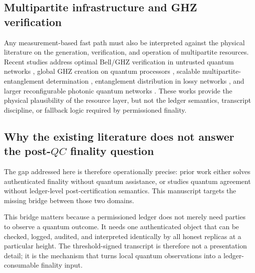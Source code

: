 \documentclass{ieeeaccess}
\begin{document}
\subsection{Multipartite infrastructure and GHZ verification}
Any measurement-based fast path must also be interpreted against the physical literature on the generation, verification, and operation of multipartite resources. Recent studies address optimal Bell/GHZ verification in untrusted quantum networks \cite{b19}, global GHZ creation on quantum processors \cite{b20}, scalable multipartite-entanglement determination \cite{b21}, entanglement distribution in lossy networks \cite{b22}, and larger reconfigurable photonic quantum networks \cite{b23}. These works provide the physical plausibility of the resource layer, but not the ledger semantics, transcript discipline, or fallback logic required by permissioned finality.

\subsection{Why the existing literature does not answer the post-$QC$ finality question}
The gap addressed here is therefore operationally precise: prior work either solves authenticated finality without quantum assistance, or studies quantum agreement without ledger-level post-certification semantics. This manuscript targets the missing bridge between those two domains.

This bridge matters because a permissioned ledger does not merely need parties to observe a quantum outcome. It needs one authenticated object that can be checked, logged, audited, and interpreted identically by all honest replicas at a particular height. The threshold-signed transcript is therefore not a presentation detail; it is the mechanism that turns local quantum observations into a ledger-consumable finality input.
\end{document}
